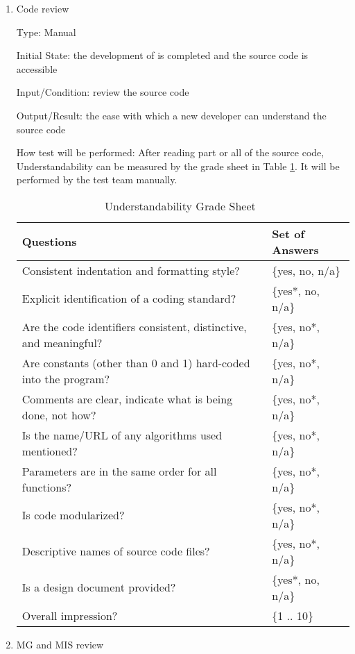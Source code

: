\documentclass[12pt, titlepage]{article}
\begin{document}
\begin{enumerate}

\item{Code review}

Type: Manual
					
Initial State: the development of \progname{} is completed and the source code
is accessible
					
Input/Condition: review the source code
					
Output/Result: the ease with which a new developer can understand the source
code
					
How test will be performed: After reading part or all of the source code,
Understandability can be measured by the grade sheet in Table
\ref{Tb_understandability}. It will be performed by the test team manually.

\begin{table}[h]
\begin{tabular}{@{}ll@{}}
\toprule
Questions & Set of Answers \\ \midrule
Consistent indentation and formatting style? & \{yes, no, n/a\} \\
Explicit identification of a coding standard? & \{yes*, no, n/a\} \\
Are the code identifiers consistent, distinctive, and meaningful? & \{yes, no*,
n/a\} \\
Are constants (other than 0 and 1) hard-coded into the program? & \{yes, no*,
n/a\} \\
Comments are clear, indicate what is being done, not how? & \{yes, no*, n/a\}
\\Is the name/URL of any algorithms used mentioned? & \{yes, no*, n/a\} \\
Parameters are in the same order for all functions? & \{yes, no*, n/a\} \\
Is code modularized? & \{yes, no*, n/a\} \\
Descriptive names of source code files? & \{yes, no*, n/a\} \\
Is a design document provided? & \{yes*, no, n/a\} \\
Overall impression? & \{1 .. 10\} \\ \bottomrule
\end{tabular}
\caption{Understandability Grade Sheet~\cite{SmithEtAl2018}}
\label{Tb_understandability}
\end{table}

\item{MG and MIS review}


\end{enumerate}
\end{document}
